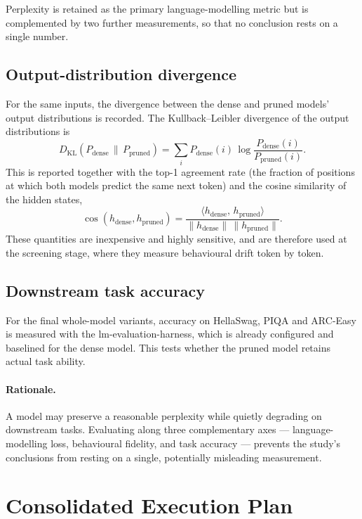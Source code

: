 \documentclass[11pt]{article}
\begin{document}
Perplexity is retained as the primary language-modelling metric but is complemented by two further
measurements, so that no conclusion rests on a single number.

\subsection{Output-distribution divergence}

For the same inputs, the divergence between the dense and pruned models' output distributions is recorded.
The Kullback--Leibler divergence of the output distributions is
\[
  D_{\mathrm{KL}}\!\left(P_{\mathrm{dense}} \,\big\|\, P_{\mathrm{pruned}}\right)
  = \sum_{i} P_{\mathrm{dense}}(i)\,\log\frac{P_{\mathrm{dense}}(i)}{P_{\mathrm{pruned}}(i)} .
\]
This is reported together with the top-1 agreement rate (the fraction of positions at which both models
predict the same next token) and the cosine similarity of the hidden states,
\[
  \cos\!\left(h_{\mathrm{dense}}, h_{\mathrm{pruned}}\right)
  = \frac{\langle h_{\mathrm{dense}},\, h_{\mathrm{pruned}}\rangle}
         {\lVert h_{\mathrm{dense}}\rVert \, \lVert h_{\mathrm{pruned}}\rVert} .
\]
These quantities are inexpensive and highly sensitive, and are therefore used at the screening stage, where
they measure behavioural drift token by token.

\subsection{Downstream task accuracy}

For the final whole-model variants, accuracy on HellaSwag, PIQA and ARC-Easy is measured with the
lm-evaluation-harness, which is already configured and baselined for the dense model. This tests whether
the pruned model retains actual task ability.

\paragraph{Rationale.} A model may preserve a reasonable perplexity while quietly degrading on downstream
tasks. Evaluating along three complementary axes --- language-modelling loss, behavioural fidelity, and
task accuracy --- prevents the study's conclusions from resting on a single, potentially misleading
measurement.

\section{Consolidated Execution Plan}
\end{document}
